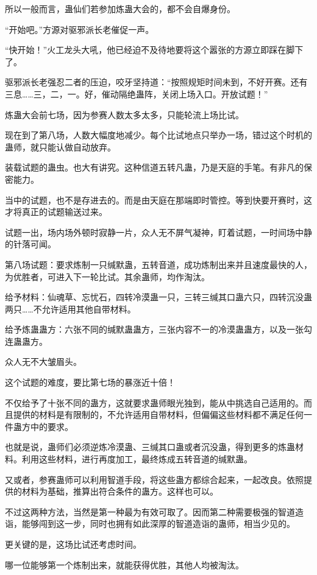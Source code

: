 \begin{this_body}
所以一般而言，蛊仙们若参加炼蛊大会的，都不会自爆身份。

“开始吧。”方源对驱邪派长老催促一声。

“快开始！”火工龙头大吼，他已经迫不及待地要将这个嚣张的方源立即踩在脚下了。

驱邪派长老强忍二者的压迫，咬牙坚持道：“按照规矩时间未到，不好开赛。还有三息……三，二，一。好，催动隔绝蛊阵，关闭上场入口。开放试题！”

炼蛊大会前七场，因为参赛人数太多太多，只能轮流上场比试。

现在到了第八场，人数大幅度地减少。每个比试地点只举办一场，错过这个时机的蛊师，就只能认做自动放弃。

装载试题的蛊虫。也大有讲究。这种信道五转凡蛊，乃是天庭的手笔。有非凡的保密能力。

当中的试题，也不是存进去的。而是由天庭在那端即时管控。等到快要开赛时，这才将真正的试题输送过来。

试题一出，场内场外顿时寂静一片，众人无不屏气凝神，盯着试题，一时间场中静的针落可闻。

第八场试题：要求炼制一只缄默蛊，五转音道，成功炼制出来并且速度最快的人，为优胜者，可进入下一轮比试。其余蛊师，均作淘汰。

给予材料：仙魂草、忘忧石，四转冷漠蛊一只，三转三缄其口蛊六只，四转沉没蛊两只……不允许适用其他自带材料。

给予炼蛊蛊方：六张不同的缄默蛊蛊方，三张内容不一的冷漠蛊蛊方，以及一张勾连蛊蛊方。

众人无不大皱眉头。

这个试题的难度，要比第七场的暴涨近十倍！

不仅给予了十张不同的蛊方，这就要求蛊师眼光独到，能从中挑选自己适用的。而且提供的材料是有限制的，不允许适用自带材料，但偏偏这些材料都不满足任何一件蛊方中的要求。

也就是说，蛊师们必须逆炼冷漠蛊、三缄其口蛊或者沉没蛊，得到更多的炼蛊材料。利用这些材料，进行再度加工，最终炼成五转音道的缄默蛊。

又或者，参赛蛊师可以利用智道手段，将这些蛊方都综合起来，一起改良。依照提供的材料为基础，推算出符合条件的蛊方。这样也可以。

不过这两种方法，当然是第一种最为有效可取了。因而第二种需要极强的智道造诣，能够闯到这一步，同时也拥有如此深厚的智道造诣的蛊师，相当少见的。

更关键的是，这场比试还考虑时间。

哪一位能够第一个炼制出来，就能获得优胜，其他人均被淘汰。


\end{this_body}
